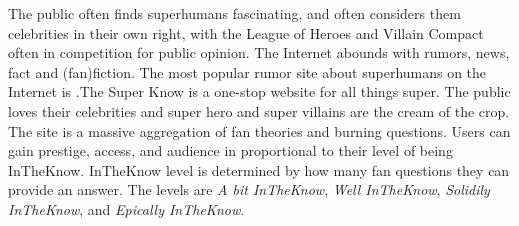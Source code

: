 \documentclass[blue]{LRSguildcamp1}
\begin{document}
The public often finds superhumans fascinating, and often considers them celebrities in their own right, with the League of Heroes and Villain Compact often in competition for public opinion.  The Internet abounds with rumors, news, fact and (fan)fiction.  The most popular rumor site about superhumans on the Internet is \pTweenwebsite{}.The Super Know is a one-stop website for all things super. The public loves their celebrities and super hero and super villains are the cream of the crop. The site is a massive aggregation of fan theories and burning questions. Users can gain prestige, access, and audience in proportional to their level of being InTheKnow. InTheKnow level is determined by how many fan questions they can provide an answer. The levels are \textit{A bit InTheKnow}, \textit{Well InTheKnow}, \textit{Solidily InTheKnow}, and \textit{Epically InTheKnow}.
\end{document}

